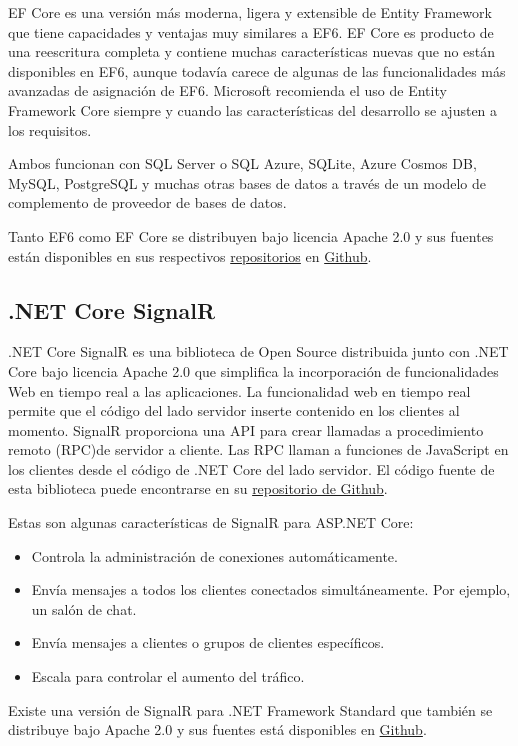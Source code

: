 EF Core es una versión más moderna, ligera y extensible de Entity Framework que tiene capacidades y ventajas muy similares a EF6. EF Core es producto de una reescritura completa y contiene muchas características nuevas que no están disponibles en EF6, aunque todavía carece de algunas de las funcionalidades más avanzadas de asignación de EF6. Microsoft recomienda el uso de Entity Framework Core siempre y cuando las características del desarrollo se ajusten a los requisitos.

Ambos funcionan con SQL Server o SQL Azure, SQLite, Azure Cosmos DB, MySQL, PostgreSQL y muchas otras bases de datos a través de un modelo de complemento de proveedor de bases de datos.

Tanto EF6 como EF Core se distribuyen bajo licencia Apache 2.0 y sus fuentes están disponibles en sus respectivos \href{https://github.com/dotnet/ef6}{repositorios} en \href{https://github.com/dotnet/efcore}{Github}.

\subsection{.NET Core SignalR}
.NET Core SignalR es una biblioteca de Open Source distribuida junto con .NET Core bajo licencia Apache 2.0 que simplifica la incorporación de funcionalidades Web en tiempo real a las aplicaciones. La funcionalidad web en tiempo real permite que el código del lado servidor inserte contenido en los clientes al momento. SignalR proporciona una API para crear llamadas a procedimiento remoto (RPC)de servidor a cliente. Las RPC llaman a funciones de JavaScript en los clientes desde el código de .NET Core del lado servidor. El código fuente de esta biblioteca puede encontrarse en su \href{https://github.com/dotnet/AspNetCore/tree/master/src/SignalR}{repositorio de Github}.

Estas son algunas características de SignalR para ASP.NET Core:
\begin{itemize}
    \item Controla la administración de conexiones automáticamente.
    \item Envía mensajes a todos los clientes conectados simultáneamente. Por ejemplo, un salón de chat.
    \item Envía mensajes a clientes o grupos de clientes específicos.
    \item Escala para controlar el aumento del tráfico.
\end{itemize}

Existe una versión de SignalR para .NET Framework Standard que también se distribuye bajo Apache 2.0 y sus fuentes está disponibles en \href{https://github.com/SignalR/SignalR}{Github}.